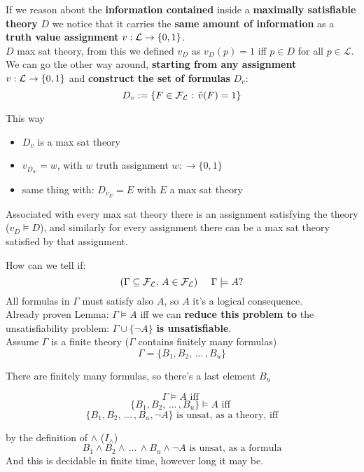 \documentclass[11pt]{article}
\begin{document}
	
	If we reason about the \textbf{information contained} inside a \textbf{maximally satisfiable theory} $D$ we notice that it carries the \textbf{same amount of information} as a \textbf{truth value assignment} $v: \mathcal{L} \rightarrow \{0,1\}$.\\
	
	$D$ max sat theory, from this we defined $v_D$ as $v_D (p) = 1$ iff $p \in D$ for all $p \in \mathcal{L}$. We can go the other way around, \textbf{starting from any assignment} $v: \mathcal{L} \rightarrow \{0,1\}$ and \textbf{construct the set of formulas} $D_v$:
	$$ D_v := \{F \in \mathcal{F}_\mathcal{L} : \, \tilde{v} (F) = 1\}$$
	
	This way 
	\begin{itemize}
		\item $D_v$ is a max sat theory 
		\item $v_{D_{w}} = w$, with $w$ truth assignment $w: \rightarrow \{0,1\}$
		\item same thing with: $D_{v_E} = E$ with $E$ a max sat theory
	\end{itemize}
	
	Associated with every max sat theory there is an assignment satisfying the theory ($v_D \models D$), and similarly for every assignment there can be a max sat theory satisfied by that assignment.\\
	
	
	\newpage
	
	How can we tell if:
	$$(\Gamma \subseteq \mathcal{F}_\mathcal{L}, \, A \in \mathcal{F}_\mathcal{L}) \;\;\;\;\; \Gamma \models A ?$$
	All formulas in $\Gamma$ must satisfy also $A$, so $A$ it's a logical consequence.\\
	
	Already proven Lemma: $\Gamma \models A$ iff we can \textbf{reduce this problem to} the unsatisfiability problem: $\Gamma \cup \{\neg A\}$ \textbf{is unsatisfiable}.\\
	
	Assume $\Gamma$ is a finite theory ($\Gamma$ contains finitely many formulas)
	$$ \Gamma = \{B_1, B_2, \, ... \, , B_u \} $$
	
	There are finitely many formulas, so there's a last element $B_u$
	
	$$ \Gamma \models A \text{ iff }$$
	$$ \{B_1, B_2, \, ... \, , B_u \} \models A \text{ iff } $$
	$$ \{B_1, B_2, \, ... \, , B_u, \neg A \} \text{ is unsat, as a theory, iff}$$
	
	by  the definition of $\wedge$ ($I_\wedge$)
	$$ B_1 \wedge B_2 \wedge \, ... \, \wedge B_u \wedge \neg A \text{ is unsat, as a formula}$$
	And this is decidable in finite time, however long it may be.\\
	
\end{document}
